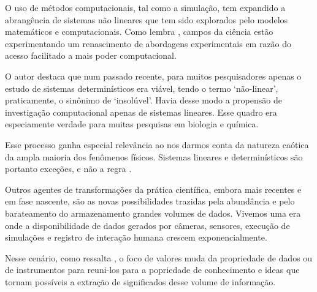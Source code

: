 O uso de métodos computacionais, tal como a simulação, tem expandido a abrangência de sistemas não lineares que tem sido explorados pelo modelos matemáticos e computacionais. Como lembra , campos da ciência estão experimentando um renascimento de abordagens experimentais em razão do acesso facilitado a mais poder computacional. 

O autor destaca que num passado recente, para muitos pesquisadores apenas o estudo de sistemas determinísticos era viável, tendo o termo `não-linear', praticamente, o sinônimo de `insolúvel'. Havia desse modo a propensão de investigação computacional apenas de sistemas lineares. Esse quadro era especiamente verdade para muitas pesquisas em biologia e química. 

Esse processo ganha especial relevância ao nos darmos conta da natureza caótica da ampla maioria dos fenômenos físicos. Sistemas lineares e determinísticos são portanto exceções, e não a regra \cite[]{Weintrop2016}.

Outros agentes de transformações da prática científica, embora mais recentes e em fase nascente, são as novas possibilidades trazidas pela abundância e pelo barateamento do armazenamento grandes volumes de dados. Vivemos uma era onde a disponibilidade de dados gerados por câmeras, sensores, execução de simulações e registro de interação humana crescem exponencialmente. 

Nesse cenário, como ressalta , o foco de valores muda da propriedade de dados ou de instrumentos para reuni-los para a popriedade de conhecimento e ideas que tornam possíveis a extração de significados desse volume de informação. 






